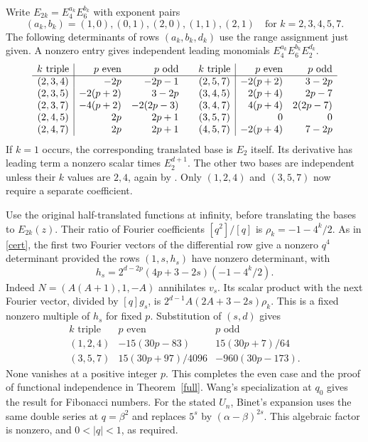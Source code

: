 \documentclass[11pt]{article}
\begin{document}
Write $E_{2k}=E_4^{a_k}E_6^{b_k}$ with exponent pairs
\[
 (a_k,b_k)=(1,0),(0,1),(2,0),(1,1),(2,1)
 \quad\text{for }k=2,3,4,5,7.
\]
The following determinants of rows $(a_k,b_k,d_k)$ use the range assignment just given. A nonzero entry gives independent leading monomials $E_4^{a_k}E_6^{b_k}E_2^{d_k}$.
\[
\begin{array}{c|rr@{\qquad}c|rr}
 k\text{ triple}&p\text{ even}&p\text{ odd}&k\text{ triple}&p\text{ even}&p\text{ odd}\\\hline
 (2,3,4)&-2p&-2p-1 &(2,5,7)&-2(p+2)&3-2p\\
 (2,3,5)&-2(p+2)&3-2p &(3,4,5)&2(p+4)&2p-7\\
 (2,3,7)&-4(p+2)&-2(2p-3)&(3,4,7)&4(p+4)&2(2p-7)\\
 (2,4,5)&2p&2p+1 &(3,5,7)&0&0\\
 (2,4,7)&2p&2p+1 &(4,5,7)&-2(p+4)&7-2p
\end{array}
\]
If $k=1$ occurs, the corresponding translated base is $E_2$ itself. Its derivative has leading term a nonzero scalar times $E_2^{d+1}$. The other two bases are independent unless their $k$ values are $2,4$, again by \cite{Griffin}. Only $(1,2,4)$ and $(3,5,7)$ now require a separate coefficient.

Use the original half-translated functions at infinity, before translating the bases to $E_{2k}(z)$. Their ratio of Fourier coefficients $[q^2]/[q]$ is $\rho_k=-1-4^k/2$. As in \eqref{cert}, the first two Fourier vectors of the differential row give a nonzero $q^4$ determinant provided the rows $(1,s,h_s)$ have nonzero determinant, with
\[
 h_s=2^{d-2p}(4p+3-2s)(-1-4^k/2).
\]
Indeed $N=(A(A+1),1,-A)$ annihilates $v_s$. Its scalar product with the next Fourier vector, divided by $[q]g_s$, is $2^{d-1}A(2A+3-2s)\rho_k$. This is a fixed nonzero multiple of $h_s$ for fixed $p$. Substitution of $(s,d)$ gives
\[
\begin{array}{c|cc}
 k\text{ triple}&p\text{ even}&p\text{ odd}\\\hline
 (1,2,4)&-15(30p-83)&15(30p+7)/64\\
 (3,5,7)&15(30p+97)/4096&-960(30p-173).
\end{array}
\]
None vanishes at a positive integer $p$. This completes the even case and the proof of functional independence in Theorem~\ref{full}. Wang's specialization at $q_0$ gives the result for Fibonacci numbers. For the stated $U_n$, Binet's expansion uses the same double series at $q=\beta^2$ and replaces $5^s$ by $(\alpha-\beta)^{2s}$. This algebraic factor is nonzero, and $0<|q|<1$, as required.
\end{document}
